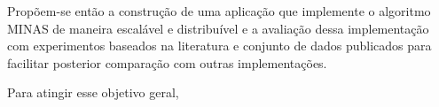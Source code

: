 Propõem-se então a construção de uma aplicação que implemente o algoritmo MINAS
de maneira escalável e distribuível e a avaliação dessa implementação com
experimentos baseados na literatura e conjunto de dados publicados para
facilitar posterior comparação com outras implementações.

Para atingir esse objetivo geral, 







